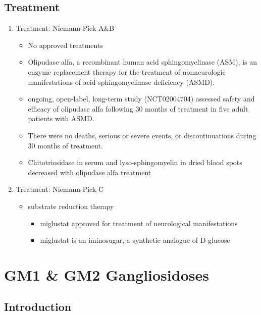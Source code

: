 \documentclass{scrartcl}
\begin{document}
\subsection{Treatment}
\label{sec:orgff8234d}
\begin{enumerate}
\item Treatment: Niemann-Pick A\&B
\label{sec:org842edd9}
\begin{itemize}
\item No approved treatments
\item Olipudase alfa, a recombinant human acid sphingomyelinase (ASM), is
an enzyme replacement therapy for the treatment of nonneurologic
manifestations of acid sphingomyelinase deficiency (ASMD).
\item ongoing, open-label, long-term study (NCT02004704) assessed safety
and efficacy of olipudase alfa following 30 months of treatment in
five adult patients with ASMD.
\item There were no deaths, serious or severe events, or discontinuations
during 30 months of treatment.
\item Chitotriosidase in serum and lyso-sphingomyelin in dried blood spots
decreased with olipudase alfa treatment
\end{itemize}

\item Treatment: Niemann-Pick C
\label{sec:orgcffa734}
\begin{itemize}
\item substrate reduction therapy
\begin{itemize}
\item miglustat approved for treatment of neurological manifestations
\item miglustat is an iminosugar, a synthetic analogue of D-glucose
\end{itemize}
\end{itemize}
\end{enumerate}

\section{GM1 \& GM2 Gangliosidoses}
\label{sec:orga9c09cf}
\subsection{Introduction}
\label{sec:orgb20fcda}
\end{document}

